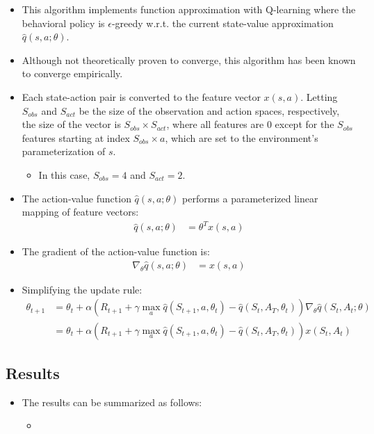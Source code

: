\documentclass[a4paper]{article}
\begin{document}
\begin{itemize}
    \item This algorithm implements function approximation with Q-learning
        where the behavioral policy is $\epsilon$-greedy w.r.t. the current
        state-value approximation $\hat{q}(s, a; \theta)$.
    \item Although not theoretically proven to converge, this algorithm has 
        been known to converge empirically.
    \item Each state-action pair is converted to the feature vector $x(s, a)$.
        Letting $S_{obs}$ and $S_{act}$ be the size of the observation and
        action spaces, respectively, the size of the vector is $S_{obs} \times
        S_{act}$, where all features are $0$ except for the $S_{obs}$ features
        starting at index $S_{obs} \times a$, which are set to the
        environment's parameterization of $s$.
        \begin{itemize}
            \item In this case, $S_{obs} = 4$ and $S_{act} = 2$.
        \end{itemize}
    \item The action-value function $\hat{q}(s, a; \theta)$ performs a
        parameterized linear mapping of feature vectors:
        \begin{align*}
            \hat{q}(s, a; \theta) &= \theta^T x(s, a)
        \end{align*}
    \item The gradient of the action-value function is:
    \begin{align*}
        \nabla_{\theta} \hat{q}(s, a; \theta) &= x(s, a)
    \end{align*}
    \item Simplifying the update rule:
    \begin{align*}
        \theta_{t + 1} &= \theta_{t} + \alpha
        \left( 
        R_{t + 1} + \gamma \max_{a}\hat{q}(S_{t + 1}, a, \theta_{t}) - 
        \hat{q}(S_{t}, A_{T}, \theta_{t})
        \right)
        \nabla_{\theta} \hat{q}(S_{t}, A_{t}; \theta) \\
        &= \theta_{t} + \alpha
        \left( 
        R_{t + 1} + \gamma \max_{a}\hat{q}(S_{t + 1}, a, \theta_{t}) - 
        \hat{q}(S_{t}, A_{T}, \theta_{t})
        \right)
        x(S_t, A_t)
    \end{align*}
\end{itemize}
\subsection*{Results}
\begin{centering}
\end{centering}
\begin{itemize}
    \item The results can be summarized as follows:
    \begin{itemize}
        \item 
    \end{itemize}
\end{itemize}
\end{document}
